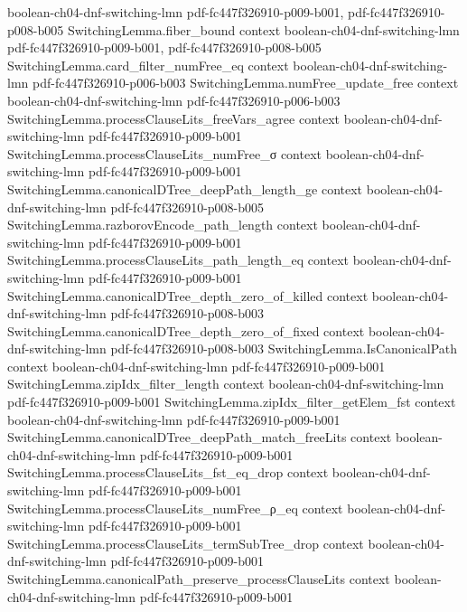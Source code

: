\begin{lemma}
  {boolean-ch04-dnf-switching-lmn}
  {pdf-fc447f326910-p009-b001,
    pdf-fc447f326910-p008-b005}
\proofstep
  {SwitchingLemma.fiber_bound}
  {context}
  {boolean-ch04-dnf-switching-lmn}
  {pdf-fc447f326910-p009-b001,
    pdf-fc447f326910-p008-b005}
\proofstep
  {SwitchingLemma.card_filter_numFree_eq}
  {context}
  {boolean-ch04-dnf-switching-lmn}
  {pdf-fc447f326910-p006-b003}
\proofstep
  {SwitchingLemma.numFree_update_free}
  {context}
  {boolean-ch04-dnf-switching-lmn}
  {pdf-fc447f326910-p006-b003}
\proofstep
  {SwitchingLemma.processClauseLits_freeVars_agree}
  {context}
  {boolean-ch04-dnf-switching-lmn}
  {pdf-fc447f326910-p009-b001}
\proofstep
  {SwitchingLemma.processClauseLits_numFree_σ}
  {context}
  {boolean-ch04-dnf-switching-lmn}
  {pdf-fc447f326910-p009-b001}
\proofstep
  {SwitchingLemma.canonicalDTree_deepPath_length_ge}
  {context}
  {boolean-ch04-dnf-switching-lmn}
  {pdf-fc447f326910-p008-b005}
\proofstep
  {SwitchingLemma.razborovEncode_path_length}
  {context}
  {boolean-ch04-dnf-switching-lmn}
  {pdf-fc447f326910-p009-b001}
\proofstep
  {SwitchingLemma.processClauseLits_path_length_eq}
  {context}
  {boolean-ch04-dnf-switching-lmn}
  {pdf-fc447f326910-p009-b001}
\proofstep
  {SwitchingLemma.canonicalDTree_depth_zero_of_killed}
  {context}
  {boolean-ch04-dnf-switching-lmn}
  {pdf-fc447f326910-p008-b003}
\proofstep
  {SwitchingLemma.canonicalDTree_depth_zero_of_fixed}
  {context}
  {boolean-ch04-dnf-switching-lmn}
  {pdf-fc447f326910-p008-b003}
\proofstep
  {SwitchingLemma.IsCanonicalPath}
  {context}
  {boolean-ch04-dnf-switching-lmn}
  {pdf-fc447f326910-p009-b001}
\proofstep
  {SwitchingLemma.zipIdx_filter_length}
  {context}
  {boolean-ch04-dnf-switching-lmn}
  {pdf-fc447f326910-p009-b001}
\proofstep
  {SwitchingLemma.zipIdx_filter_getElem_fst}
  {context}
  {boolean-ch04-dnf-switching-lmn}
  {pdf-fc447f326910-p009-b001}
\proofstep
  {SwitchingLemma.canonicalDTree_deepPath_match_freeLits}
  {context}
  {boolean-ch04-dnf-switching-lmn}
  {pdf-fc447f326910-p009-b001}
\proofstep
  {SwitchingLemma.processClauseLits_fst_eq_drop}
  {context}
  {boolean-ch04-dnf-switching-lmn}
  {pdf-fc447f326910-p009-b001}
\proofstep
  {SwitchingLemma.processClauseLits_numFree_ρ_eq}
  {context}
  {boolean-ch04-dnf-switching-lmn}
  {pdf-fc447f326910-p009-b001}
\proofstep
  {SwitchingLemma.processClauseLits_termSubTree_drop}
  {context}
  {boolean-ch04-dnf-switching-lmn}
  {pdf-fc447f326910-p009-b001}
\proofstep
  {SwitchingLemma.canonicalPath_preserve_processClauseLits}
  {context}
  {boolean-ch04-dnf-switching-lmn}
  {pdf-fc447f326910-p009-b001}
\proofstep

\end{lemma}
